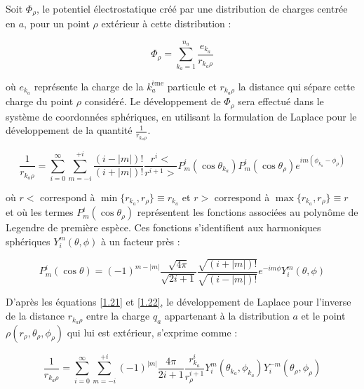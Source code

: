 	Soit $\Phi_{\rho}$, le potentiel électrostatique créé par une distribution de charges centrée en $a$, pour un point $\rho$ extérieur à cette distribution : 
	
	\begin{equation}
	\Phi_{\rho} = \sum_{k_{a}=1}^{n_{a}} \frac{e_{k_{a}}}{r_{k_{a}\rho}} \label{1.20}
	\end{equation}
	
	\noindent où $e_{k_{a}}$ représente la charge de la $k_{a}^{\text{ème}}$ particule et $r_{k_{a}\rho}$ la distance qui sépare cette charge du point $\rho$ considéré. Le développement de $\Phi_{\rho}$ sera effectué dans le système de coordonnées sphériques, en utilisant la formulation de Laplace pour le développement de la quantité $\frac{1}{r_{k_{a}\rho}}$.
	
	\begin{equation}
	\frac{1}{r_{k_{a}\rho}} = \sum_{i=0}^{\infty} \sum_{m=-i}^{+i} \frac{(i-|m|)!}{(i+ |m|)!} \frac{r^{i}<}{r^{i+1}>} P_{m}^{i} (\cos\theta_{k_{a}}) P^{i}_{m}(\cos\theta_{\rho})e^{im(\phi_{k_{a}}- \phi_{\rho})} \label{1.21}
	\end{equation}
	
	où $r <$ correspond à $\min \{r_{k_{a}}, r_{\rho}\} \equiv r_{k_{a}}$ et
	$r >$ correspond à $\max \{r_{k_{a}}, r_{\rho}\} \equiv r$
	et où les termes $P_{m}^{i} (\cos\theta_{\rho})$ représentent les fonctions associées au polynôme de Legendre de première espèce. Ces fonctions s'identifient aux harmoniques sphériques $Y_{i}^{m}(\theta,\phi)$ à un facteur près : 
	
	\begin{equation}
	P_{m}^{i}(\cos\theta) = (-1)^{m-|m|} \frac{\sqrt{4\pi}}{\sqrt{2i+ 1}} \frac{\sqrt{(i+ |m|)!}}{\sqrt{(i-|m|)!}} e^{-im\phi} Y_{i}^{m}(\theta,\phi) \label{1.22}
	\end{equation}
	
	D'après les équations \ref{1.21} et \ref{1.22}, le développement de Laplace pour l'inverse de la distance $r_{k_{a}\rho}$ entre la charge $q_{a}$ appartenant à la distribution $a$ et le point $\rho(r_{\rho}, \theta_{\rho}, \phi_{\rho})$ qui lui est extérieur, s'exprime comme : 
	
	\begin{equation}
	\frac{1}{r_{k_{a}\rho}} = \sum_{i=0}^{\infty} \sum_{m=-i}^{+i} (-1)^{|m|} \frac{4\pi}{2i +1} \frac{r_{k_{a}}^{i}}{r_{\rho}^{i+1}} Y^{m}_{i} (\theta_{k_{a}}, \phi_{k_{a}}) Y_{i}^{-m} (\theta_{\rho},\phi_{\rho})  \label{1.23}
	\end{equation}
	
